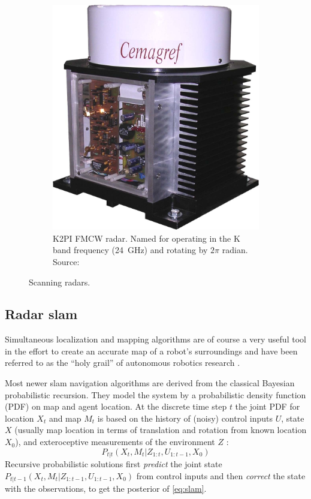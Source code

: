 \begin{figure}[htbp]
\begin{subfigure}[t]{0.3\textwidth}
        \includegraphics[max width=\linewidth]{gfx/pictures/k2pi}
        \caption{K2PI FMCW radar. Named for operating in the K band frequency (\SI{24}{GHz}) and rotating by $2\pi$ radian. Source: \cite{Rouveure2008}}
        \label{fig:k2pi}
    \end{subfigure}
    \caption{Scanning radars.}
\end{figure}


\subsection{Radar slam}\label{radar-slam}


Simultaneous localization and mapping algorithms are of course a very useful tool in the effort to create an accurate map of a robot's surroundings and have been referred to as the ``holy grail'' of autonomous robotics research \cite{Dissanayake2001}.

Most newer slam navigation algorithms are derived from the classical Bayesian probabilistic recursion. They model the system by a probabilistic density function (PDF) on map and agent location. At the discrete time step $t$ the joint PDF for location $X_t$ and map $M_t$ is based on the history of (noisy) control inputs $U$, state $X$ (usually map location in terms of translation and rotation from known location $X_0$), and exteroceptive measurements of the environment $Z$ \cite{Adams2012}:
\begin{equation} \label{eq:slam}
    P_{t|t}(X_t,M_t|Z_{1:t},U_{1:t-1},X_0)
\end{equation}
Recursive probabilistic solutions first \textit{predict} the joint state \( P_{t|t-1}(X_t,M_t|Z_{1:t-1},U_{1:t-1},X_0) \) from control inputs and then \textit{correct} the state with the observations, to get the posterior of \cref{eq:slam}.

